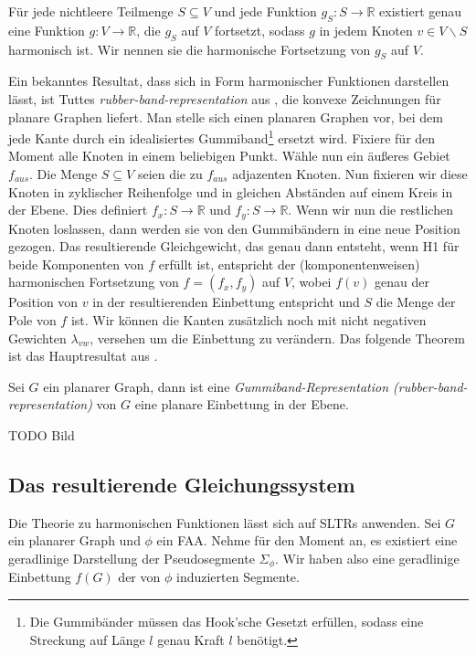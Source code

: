 \begin{theorem}\cite[Theorem 3.1.2]{lov99}\label{harmonic_uni}
Für jede nichtleere Teilmenge $S \subseteq V$ und jede Funktion $g_S:S\to\mathbb{R}$ existiert genau eine Funktion $g:V\to\mathbb{R}$, die $g_S$ auf $V$ fortsetzt, sodass $g$ in jedem Knoten $v\in V \backslash S$ harmonisch ist. Wir nennen sie die harmonische Fortsetzung von $g_S$ auf $V$.
\end{theorem}

Ein bekanntes Resultat, dass sich in Form harmonischer Funktionen darstellen lässt, ist Tuttes \textit{rubber-band-representation} aus \cite{tutte63}, die konvexe Zeichnungen für planare Graphen liefert. Man stelle sich einen planaren Graphen vor, bei dem jede Kante durch ein idealisiertes Gummiband\footnote{Die Gummibänder müssen das Hook'sche Gesetzt erfüllen, sodass eine Streckung auf Länge $l$ genau Kraft $l$ benötigt.} ersetzt wird. Fixiere für den Moment alle Knoten in einem beliebigen Punkt. Wähle nun ein äußeres Gebiet $f_{aus}$. Die Menge $S\subseteq V$ seien die zu $f_{aus}$ adjazenten Knoten. Nun fixieren wir diese Knoten in zyklischer Reihenfolge und in gleichen Abständen auf einem Kreis in der Ebene. Dies definiert $f_x:S \to \mathbb{R}$ und  $f_y:S \to \mathbb{R}$. Wenn wir nun die restlichen Knoten loslassen, dann werden sie von den Gummibändern in eine neue Position gezogen. Das resultierende Gleichgewicht, das genau dann entsteht, wenn H1 für beide Komponenten von $f$ erfüllt ist, entspricht der (komponentenweisen) harmonischen Fortsetzung von $f=(f_x,f_y)$  auf $V$, wobei $f(v)$ genau der Position von $v$ in der resultierenden Einbettung entspricht und $S$ die Menge der Pole von $f$ ist. Wir können die Kanten zusätzlich noch mit nicht negativen Gewichten $\lambda_{vw}$, versehen um die Einbettung zu verändern. Das folgende Theorem ist das Hauptresultat aus \cite{tutte63}.

\begin{theorem}\label{theo_rubber}
Sei $G$ ein planarer Graph, dann ist eine \textit{Gummiband-Representation (rubber-band-representation)} von $G$ eine planare Einbettung in der Ebene.
\end{theorem}

TODO Bild

\subsection{Das resultierende Gleichungssystem}\label{the_equations}

Die Theorie zu harmonischen Funktionen lässt sich auf SLTRs anwenden. Sei $G$ ein planarer Graph und $\phi$ ein FAA. Nehme für den Moment an, es existiert eine geradlinige Darstellung der Pseudosegmente $\Sigma_{\phi}$. Wir haben also eine geradlinige Einbettung $f(G)$ der von $\phi$ induzierten Segmente. 

